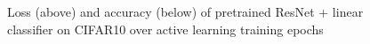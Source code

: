 \documentclass{article}
\begin{document}
\begin{flushleft}
\begin{figure}[h]
    \caption{Loss (above) and accuracy (below) of pretrained ResNet + linear classifier on CIFAR10 over active learning training epochs}
\end{figure}
\end{flushleft}
\end{document}
